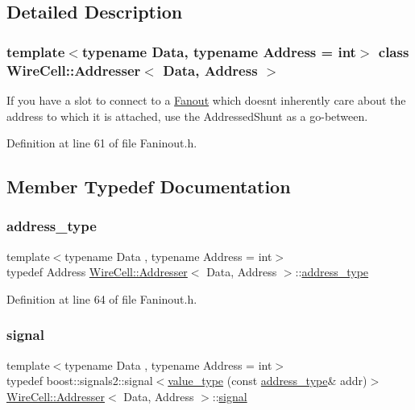 \subsection{Detailed Description}
\subsubsection*{template$<$typename Data, typename Address = int$>$\newline
class Wire\+Cell\+::\+Addresser$<$ Data, Address $>$}

If you have a slot to connect to a \hyperlink{class_wire_cell_1_1_fanout}{Fanout} which doesn\textquotesingle{}t inherently care about the address to which it is attached, use the Addressed\+Shunt as a go-\/between. 

Definition at line 61 of file Faninout.\+h.



\subsection{Member Typedef Documentation}
\mbox{\label{class_wire_cell_1_1_addresser_af284800d5e9ccf8b92d3456888969e75}} 
\subsubsection{\texorpdfstring{address\+\_\+type}{address\_type}}
{\footnotesize\ttfamily template$<$typename Data , typename Address  = int$>$ \\
typedef Address \hyperlink{class_wire_cell_1_1_addresser}{Wire\+Cell\+::\+Addresser}$<$ Data, Address $>$\+::\hyperlink{class_wire_cell_1_1_addresser_af284800d5e9ccf8b92d3456888969e75}{address\+\_\+type}}



Definition at line 64 of file Faninout.\+h.

\mbox{\label{class_wire_cell_1_1_addresser_aa72cf5fb36dc246686aabfecdb621ea3}} 
\subsubsection{\texorpdfstring{signal}{signal}}
{\footnotesize\ttfamily template$<$typename Data , typename Address  = int$>$ \\
typedef boost\+::signals2\+::signal$<$\hyperlink{class_wire_cell_1_1_addresser_a125c54e88bc3ed2233b1730e0a19d82b}{value\+\_\+type} (const \hyperlink{class_wire_cell_1_1_addresser_af284800d5e9ccf8b92d3456888969e75}{address\+\_\+type}\& addr)$>$ \hyperlink{class_wire_cell_1_1_addresser}{Wire\+Cell\+::\+Addresser}$<$ Data, Address $>$\+::\hyperlink{class_wire_cell_1_1_addresser_aa72cf5fb36dc246686aabfecdb621ea3}{signal}}



